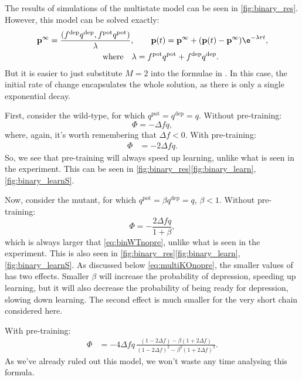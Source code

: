 \documentclass[12pt]{article}
\newcommand{\pr}{\mathbf{p}}
\newcommand{\eq}{\pr^\infty}
\newcommand{\pot}{^{\text{pot}}}
\newcommand{\dep}{^{\text{dep}}}
\begin{document}
The results of simulations of the multistate model can be seen in \autoref{fig:binary_res}.
However, this model can be solved exactly:
%
\begin{multline}\label{eq:binarysol}
  \eq = \frac{(f\dep q\dep, f\pot q\pot)}{\lambda},
  \qquad
  \pr(t) = \eq + (\pr(t)-\eq)\e^{-\lambda rt},\\
  \qquad \text{where} \quad
  \lambda = f\pot q\pot + f\dep q\dep.
\end{multline}
%
But it is easier to just substitute $M=2$ into the formulae in .
In this case, the initial rate of change encapsulates the whole solution, as there is only a single exponential decay.

First, consider the wild-type, for which $q\pot=q\dep=q$.
Without pre-training:
%
\begin{equation}\label{eq:binWTnopre}
  \Phi = -\Delta f q,
\end{equation}
%
where, again, it's worth remembering that $\Delta f<0$.
With pre-training:
%
\begin{equation}\label{eq:binWTpre}
\begin{aligned}
  \Phi &= -2\Delta f q.
\end{aligned}
\end{equation}
%
So, we see that pre-training will always speed up learning, unlike what is seen in the experiment.
This can be seen in \autoref{fig:binary_res}\ref{fig:binary_learn},\ref{fig:binary_learnS}.

Now, consider the mutant, for which $q\pot=\beta q\dep=q$, $\beta<1$.
Without pre-training:
%
\begin{equation}\label{eq:binKOnopre}
  \Phi = -\frac{2\Delta f q}{1+\beta},
\end{equation}
%
which is always larger that \eqref{eq:binWTnopre}, unlike what is seen in the experiment.
This is also seen in \autoref{fig:binary_res}\ref{fig:binary_learn},\ref{fig:binary_learnS}.
As discussed below \eqref{eq:multiKOnopre}, the smaller values of has two effects.
Smaller $\beta$ will increase the probability of depression, speeding up learning, but it will also decrease the probability of being ready for depression, slowing down learning.
The second effect is much smaller for the very short chain considered here.

With pre-training:
%
\begin{equation}\label{eq:binKOpre}
\begin{aligned}
  \Phi &= -4\Delta f q \, \frac{(1-2\Delta f) - \beta(1+2\Delta f)}
          {(1-2\Delta f)^2 - \beta^2(1+2\Delta f)^2}.
\end{aligned}
\end{equation}
%
As we've already ruled out this model, we won't waste any time analysing this formula.
\end{document}
